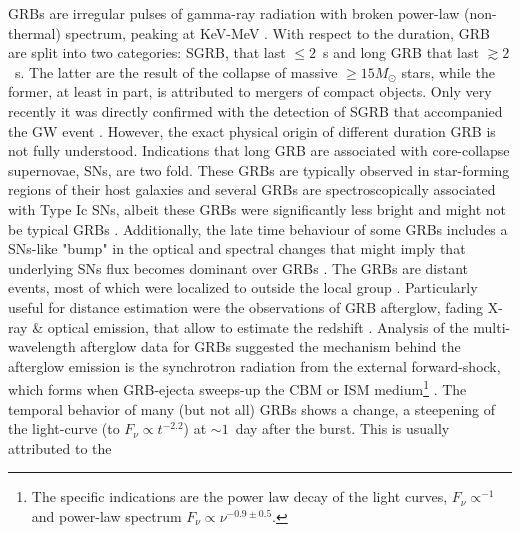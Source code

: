 \acp{GRB} are irregular pulses of gamma-ray radiation with broken power-law 
(non-thermal) spectrum, peaking at KeV-MeV \citep{Band:1993,Kouveliotou:1993,Meegan:1992xg}.
%
With respect to the duration, \ac{GRB} are split into two categories: \ac{SGRB}, 
that last ${\leq}2$~s and long \ac{GRB} that last ${\gtrsim}2$~s. The latter are the 
result of the collapse of massive ${\geq}15M_{\odot}$ stars, while the former, at 
least in part, is attributed to mergers of compact objects. Only very recently it 
was directly confirmed with the detection of \ac{SGRB} \GRB{} that accompanied 
the \ac{GW} event \GW{} \citep{TheLIGOScientific:2017qsa}. However, the exact physical 
origin of different duration \ac{GRB} is not fully understood.
%
Indications that long \ac{GRB} are associated with core-collapse supernovae, \acp{SN}, 
are two fold. These \acp{GRB} are typically observed in star-forming regions of their 
host galaxies \citep[\eg][]{Bloom:2000pq,Bloom:2002hc,Fruchter:2006py,Christensen:2004yx,CastroCeron:2006jh} 
and several \acp{GRB} are spectroscopically associated with Type Ic \acp{SN}, albeit 
these \acp{GRB} were significantly less bright and might not be typical \acp{GRB} 
\citep[\eg][]{Liang:2006ci,Bromberg:2011fm}. Additionally, the late time behaviour 
of some \acp{GRB} includes a \acp{SN}-like "bump" in the optical and spectral changes 
that might imply that underlying \acp{SN} flux becomes dominant over \acp{GRB} 
\citep[\eg][]{Bloom:1999,Woosley:2006fn}.
%
The \acp{GRB} are distant events, most of which were localized to outside the local 
group \citep[\eg][]{Mao:1992,Piran:1992,Fenimore:1993}. Particularly useful for distance 
estimation were the observations of \ac{GRB} afterglow, fading X-ray \& optical emission, 
that allow to estimate the redshift \citep[\eg][]{Costa:1997cg,Frontera:1997ae}.
%
Analysis of the multi-wavelength afterglow data for \acp{GRB} \citep[\eg][]{Panaitescu:2001bx} 
suggested the mechanism behind the afterglow emission is the synchrotron radiation from the 
external forward-shock, which forms when \ac{GRB}-ejecta sweeps-up the \ac{CBM} or \ac{ISM}
medium\footnote{
    The specific indications are the power law decay of the light curves, 
    $F_{\nu}\propto^{-1}$ and power-law spectrum $F_{\nu}\propto\nu^{-0.9\pm 0.5}$.
} 
\citep{Rees:1992ek,Paczynski:1993gz,Meszaros:1993ju,Meszaros:1996sv}.
%
The temporal behavior of many (but not all) \acp{GRB} shows a change, a steepening 
of the light-curve (to $F_{\nu}\propto t^{-2.2}$) at $\sim 1$~day after the burst. 
This is usually attributed to the 
